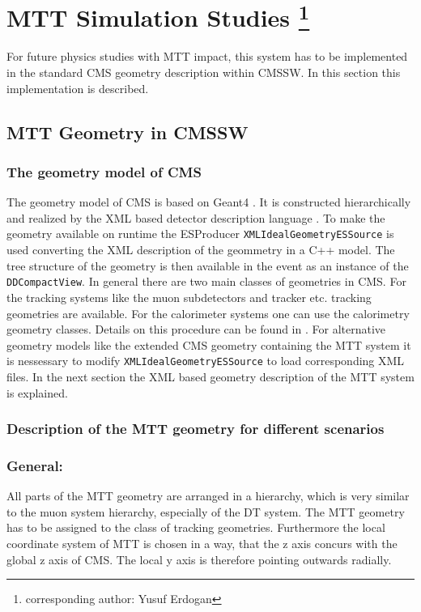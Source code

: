 \section[MTT Simulation Studies]{MTT Simulation Studies \footnote{corresponding author: Yusuf Erdogan}}
\label{sec:MTTsimulation}
	For future physics studies with MTT impact, this system has to be implemented in the standard CMS geometry description within CMSSW.
	In this section this implementation is described. 
	\subsection{MTT Geometry in CMSSW}
		\subsubsection{The geometry model of CMS}
			The geometry model of CMS is based on Geant4 \cite{Geant4}.
			It is constructed hierarchically and realized by the XML based detector description language \cite{CMSDDL}.
			To make the geometry available on runtime the ESProducer \verb+XMLIdealGeometryESSource+ is used converting the XML description of the geommetry in a C++ model.
			The tree structure of the geometry is then available in the event as an instance of the \verb+DDCompactView+.
			In general there are two main classes of geometries in CMS.
			For the tracking systems like the muon subdetectors and tracker etc. tracking geometries are available.
			For the calorimeter systems one can use the calorimetry geometry classes.
			Details on this procedure can be found in \cite{CMSDDL}.
			For alternative geometry models like the extended CMS geometry containing the MTT system it is nessessary to modify \verb+XMLIdealGeometryESSource+ to load corresponding XML
			files.
			In the next section the XML based geometry description of the MTT system is explained.
		\subsubsection{Description of the MTT geometry for different scenarios}
			\subsubsection*{General:}
			All parts of the MTT geometry are arranged in a hierarchy, which is very similar to the muon system hierarchy, especially of the DT system.
			The MTT geometry has to be assigned to the class of tracking geometries.
			Furthermore the local coordinate system of MTT is chosen in a way, that the z axis concurs with the global z axis of CMS.
			The local y axis is therefore pointing outwards radially.
